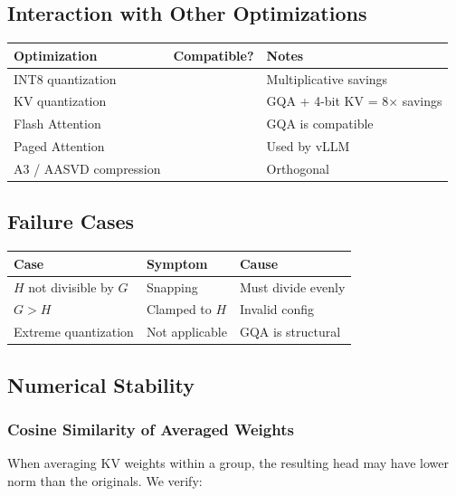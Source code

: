 \subsection{Interaction with Other Optimizations}

\begin{table}[H]
\centering
\small
\begin{tabular}{lll}
\toprule
\textbf{Optimization} & \textbf{Compatible?} & \textbf{Notes} \\
\midrule
INT8 quantization &  & Multiplicative savings \\
KV quantization &  & GQA + 4-bit KV = 8$\times$ savings \\
Flash Attention &  & GQA is compatible \\
Paged Attention &  & Used by vLLM \\
A3 / AASVD compression &  & Orthogonal \\
\bottomrule
\end{tabular}
\end{table}

\subsection{Failure Cases}

\begin{table}[H]
\centering
\small
\begin{tabular}{lll}
\toprule
\textbf{Case} & \textbf{Symptom} & \textbf{Cause} \\
\midrule
$H$ not divisible by $G$ & Snapping & Must divide evenly \\
$G > H$ & Clamped to $H$ & Invalid config \\
Extreme quantization & Not applicable & GQA is structural \\
\bottomrule
\end{tabular}
\end{table}

\subsection{Numerical Stability}

\subsubsection{Cosine Similarity of Averaged Weights}

When averaging KV weights within a group, the resulting head may have lower 
norm than the originals. We verify:

